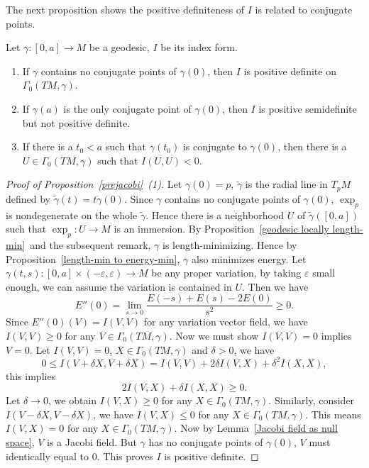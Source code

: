 The next proposition shows the positive definiteness of $I$ is related to conjugate points.
\begin{prop}\label{prejacobi}
    Let $\gamma:[0,a]\to M$ be a geodesic, $I$ be its index form.
    \begin{enumerate}[(1)]
        \item If $\gamma$ contains no conjugate points of $\gamma(0)$, then $I$ is positive definite on $\Gamma_0(TM,\gamma)$.
        \item If $\gamma(a)$ is the only conjugate point of $\gamma(0)$, then $I$ is positive semidefinite but not positive definite.
        \item If there is a $t_0<a$ such that $\gamma(t_0)$ is conjugate to $\gamma(0)$, then there is a $U\in\Gamma_0(TM,\gamma)$ such that $I(U,U)<0$. 
    \end{enumerate}
\end{prop}
\begin{proof}[Proof of Proposition~\ref{prejacobi}~(1)]
    Let $\gamma(0)=p$, $\tilde\gamma$ is the radial line in $T_pM$ defined by $\tilde\gamma(t)=t\dot\gamma(0)$.
    Since $\gamma$ contains no conjugate points of $\gamma(0)$, $\exp_p$ is nondegenerate on the whole $\tilde\gamma$.
    Hence there is a neighborhood $U$ of $\tilde\gamma([0,a])$ such that $\exp_p:U\to M$ is an immersion.
    By Proposition~\ref{geodesic locally length-min}~and the subsequent remark, $\gamma$ is length-minimizing.
    Hence by Proposition~\ref{length-min to energy-min}, $\gamma$ also minimizes energy.
    Let $\gamma(t,s):[0,a]\times(-\varepsilon,\varepsilon)\to M$ be any proper variation, by taking $\varepsilon$ small enough, we can assume the variation is contained in $U$.
    Then we have
    \[E''(0)=\lim_{s\to 0}\frac{E(-s)+E(s)-2E(0)}{s^2}\geq 0.\]
    Since $E''(0)(V)=I(V,V)$ for any variation vector field, we have $I(V,V)\geq 0$ for any $V\in\Gamma_0(TM,\gamma)$.
    Now we must show $I(V,V)=0$ implies $V=0$.
    Let $I(V,V)=0$, $X\in\Gamma_0(TM,\gamma)$ and $\delta>0$, we have
    \[0\leq I(V+\delta X,V+\delta X)=I(V,V)+2\delta I(V,X)+\delta^2I(X,X),\]
    this implies
    \[2I(V,X)+\delta I(X,X)\geq 0.\]
    Let $\delta\to 0$, we obtain $I(V,X)\geq 0$ for any $X\in\Gamma_0(TM,\gamma)$.
    Similarly, consider $I(V-\delta X,V-\delta X)$, we have $I(V,X)\leq 0$ for any $X\in\Gamma_0(TM,\gamma)$.
    This means $I(V,X)=0$ for any $X\in\Gamma_0(TM,\gamma)$.
    Now by Lemma~\ref{Jacobi field as null space}, $V$ is a Jacobi field.
    But $\gamma$ has no conjugate points of $\gamma(0)$, $V$ must identically equal to $0$.
    This proves $I$ is positive definite.
\end{proof}

